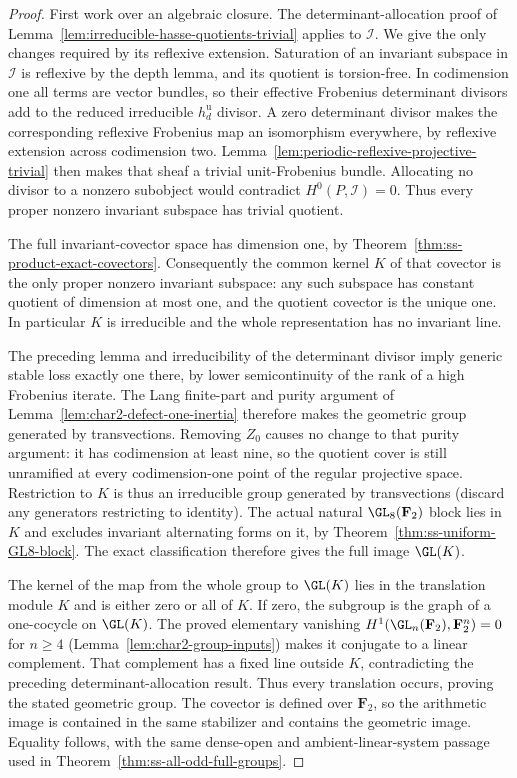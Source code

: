 \begin{proof}
First work over an algebraic closure. The determinant-allocation
proof of Lemma~\ref{lem:irreducible-hasse-quotients-trivial}
applies to $\mathcal I$. We give the only changes required by
its reflexive extension. Saturation of an invariant subspace in
$\mathcal I$ is reflexive by the depth lemma, and its quotient
is torsion-free. In codimension one all terms are vector bundles,
so their effective Frobenius determinant divisors add to the
reduced irreducible $h_d^{\mathrm u}$ divisor. A zero determinant
divisor makes the corresponding reflexive Frobenius map an
isomorphism everywhere, by reflexive extension across codimension
two. Lemma~\ref{lem:periodic-reflexive-projective-trivial} then
makes that sheaf a trivial unit-Frobenius bundle.
Allocating no divisor to a nonzero subobject would contradict
$H^0(P,\mathcal I)=0$. Thus every proper nonzero invariant
subspace has trivial quotient.

The full invariant-covector space has dimension one, by
Theorem~\ref{thm:ss-product-exact-covectors}.
Consequently the common kernel $K$ of that covector is the
only proper nonzero invariant subspace: any such subspace has
constant quotient of dimension at most one, and the quotient
covector is the unique one. In particular $K$ is irreducible
and the whole representation has no invariant line.

The preceding lemma and irreducibility of the determinant
divisor imply generic stable loss exactly one there, by lower
semicontinuity of the rank of a high Frobenius iterate.
The Lang finite-part and purity argument of
Lemma~\ref{lem:char2-defect-one-inertia} therefore makes the
geometric group generated by transvections. Removing $Z_0$
causes no change to that purity argument: it has codimension
at least nine, so the quotient cover is still unramified at
every codimension-one point of the regular projective space.
Restriction to $K$ is thus an irreducible group generated by
transvections (discard any generators restricting to identity).
The actual natural $\GL_8(\mathbf F_2)$ block lies in $K$ and
excludes invariant alternating forms on it, by
Theorem~\ref{thm:ss-uniform-GL8-block}.
The exact classification
\cite[Theorem~3.6, printed p.~22]{KantorSeress2001}
therefore gives the full image $\GL(K)$.

The kernel of the map from the whole group to $\GL(K)$ lies
in the translation module $K$ and is either zero or all of $K$.
If zero, the subgroup is the graph of a one-cocycle on $\GL(K)$.
The proved elementary vanishing
$H^1(\GL_n(\mathbf F_2),\mathbf F_2^n)=0$ for $n\ge4$
(Lemma~\ref{lem:char2-group-inputs}) makes it conjugate to a
linear complement. That complement has a fixed line outside
$K$, contradicting the preceding determinant-allocation result.
Thus every translation occurs, proving the stated geometric group.
The covector is defined over $\mathbf F_2$, so the arithmetic
image is contained in the same stabilizer and contains the
geometric image. Equality follows, with the same dense-open and
ambient-linear-system passage used in
Theorem~\ref{thm:ss-all-odd-full-groups}.
\end{proof}

